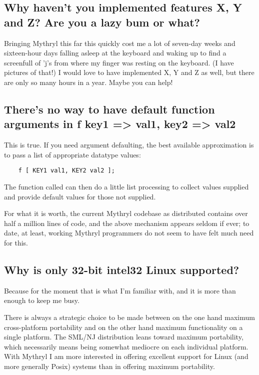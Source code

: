 \subsection{Why haven't you implemented features X, Y and Z?  Are you a lazy bum or what?}

Bringing Mythryl this far this quickly cost me a lot of seven-day weeks 
and sixteen-hour days falling asleep at the keyboard and waking up to 
find a screenfull of 'j's from where my finger was resting on the 
keyboard.  (I have pictures of that!)  I would love to have 
implemented X, Y and Z as well, but there are only so many hours in a 
year.  Maybe you can help!

\subsection{There's no way to have default function arguments in f { key1 => val1, key2 => val2 }}

This is true.  If you need argument defaulting, the best available 
approximation is to pass a list of appropriate datatype values: 
\begin{verbatim}
    f [ KEY1 val1, KEY2 val2 ];
\end{verbatim}
The function called can then do a little list processing to collect 
values supplied and provide default values for those not supplied.

For what it is worth, the current Mythryl codebase as distributed 
contains over half a million lines of code, and the above mechanism 
appears seldom if ever;  to date, at least, working Mythryl programmers 
do not seem to have felt much need for this.

\subsection{Why is only 32-bit intel32 Linux supported?}

Because for the moment that is what I'm familiar with, and it is more 
than enough to keep me busy.

There is always a strategic choice to be made between on the one hand 
maximum cross-platform portability and on the other hand maximum 
functionality on a single platform.  The SML/NJ distribution leans 
toward maximum portability, which necessarily means being somewhat 
mediocre on each individual platform.  With Mythryl I am more 
interested in offering excellent support for Linux (and more generally 
Posix) systems than in offering maximum portability.

